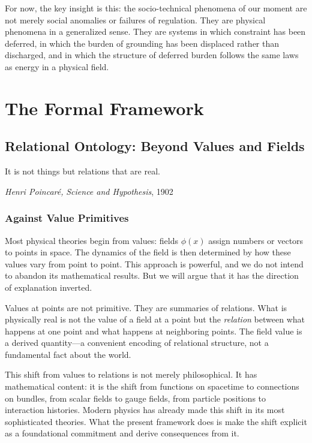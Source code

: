 \documentclass[12pt,a4paper,openany]{book}
\theoremstyle{plain}
\theoremstyle{definition}
\theoremstyle{remark}
\begin{document}
For now, the key insight is this: the socio-technical phenomena of our moment are not merely social anomalies or failures of regulation. They are physical phenomena in a generalized sense. They are systems in which constraint has been deferred, in which the burden of grounding has been displaced rather than discharged, and in which the structure of deferred burden follows the same laws as energy in a physical field.


\part{The Formal Framework}

\chapter{Relational Ontology: Beyond Values and Fields}

\epigraph{%
  It is not things but relations that are real.
}{%
  \textit{Henri Poincaré,} \textit{Science and Hypothesis}, 1902
}

\section{Against Value Primitives}

Most physical theories begin from values: fields $\phi(x)$ assign numbers or vectors to points in space. The dynamics of the field is then determined by how these values vary from point to point. This approach is powerful, and we do not intend to abandon its mathematical results. But we will argue that it has the direction of explanation inverted.

Values at points are not primitive. They are summaries of relations. What is physically real is not the value of a field at a point but the \emph{relation} between what happens at one point and what happens at neighboring points. The field value is a derived quantity---a convenient encoding of relational structure, not a fundamental fact about the world.

This shift from values to relations is not merely philosophical. It has mathematical content: it is the shift from functions on spacetime to connections on bundles, from scalar fields to gauge fields, from particle positions to interaction histories. Modern physics has already made this shift in its most sophisticated theories. What the present framework does is make the shift explicit as a foundational commitment and derive consequences from it.
\end{document}
